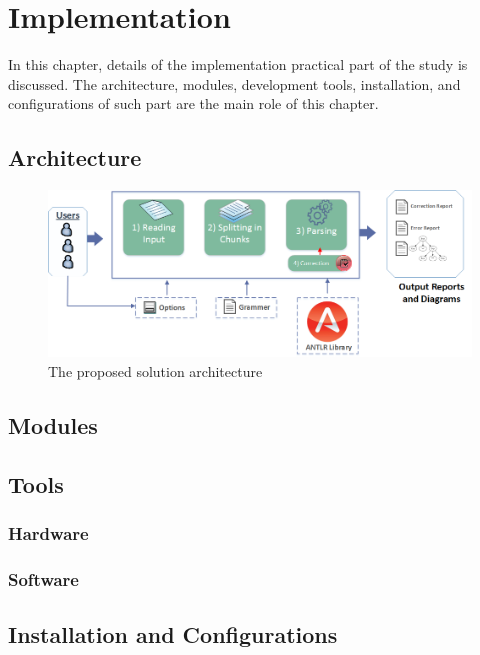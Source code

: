 \chapter{Implementation}
\label{ch:implementation}


In this chapter, details of the implementation practical part of the study is discussed. The architecture, modules, development tools, installation, and configurations of such part are the main role of this chapter.    
\section {Architecture}
	\begin{figure}[ht]
	\begin{center}
		\includegraphics[scale=0.6,angle=0]{images/Architecture}
		\caption{The proposed solution architecture}
		\label{Fig:Architecture}
	\end{center}
\end{figure}
\section {Modules} 
\section{Tools}
\subsection{Hardware}
\subsection{Software}

\section{Installation and Configurations}












